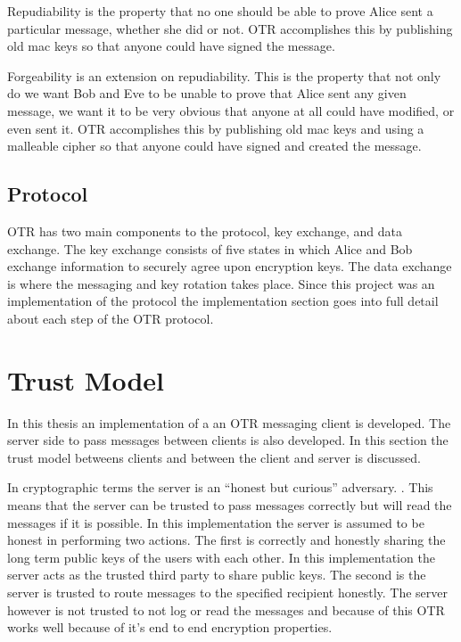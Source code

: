 Repudiability is the property that no one should be able to prove Alice sent a particular message, whether she did or not. OTR accomplishes this by publishing old mac keys so that anyone could have signed the message.


Forgeability is an extension on repudiability. This is the property that not only do we want Bob and Eve to be unable to prove that Alice sent any given message, we want it to be very obvious that anyone at all could have modified, or even sent it. OTR accomplishes this by publishing old mac keys and using a malleable cipher so that anyone could have signed and created the message.


\cite{otr-paper}


\subsection{Protocol}


OTR has two main components to the protocol, key exchange, and data exchange. The key exchange consists of five states in which Alice and Bob exchange information to securely agree upon encryption keys. The data exchange is where the messaging and key rotation takes place.
Since this project was an implementation of the protocol the implementation section goes into full detail about each step of the OTR protocol. 


\cite{otr-protocol}


\section{Trust Model}


In this thesis an implementation of a an OTR messaging client is developed. The server side to pass messages between clients is also developed. In this section the trust model betweens clients and between the client and server is discussed. 


In cryptographic terms the server is an “honest but curious” adversary. \cite{sjcl-paper}. This means that the server can be trusted to pass messages correctly but will read the messages if it is possible. In this implementation the server is assumed to be honest in performing two actions. The first is correctly and honestly sharing the long term public keys of the users with each other. In this implementation the server acts as the trusted third party to share public keys. The second is the server is trusted to route messages to the specified recipient honestly. The server however is not trusted to not log or read the messages and because of this OTR works well because of it’s end to end encryption properties.

